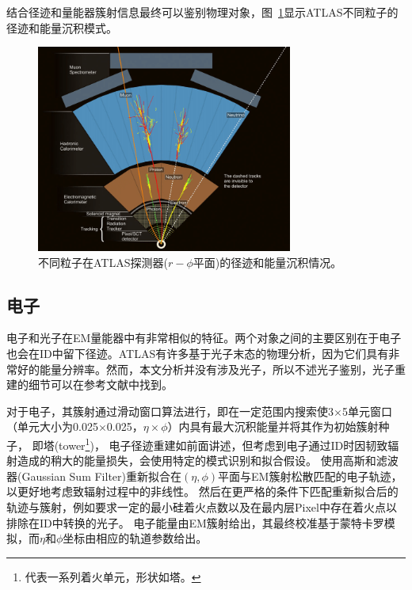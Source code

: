 结合径迹和量能器簇射信息最终可以鉴别物理对象，图~\ref{fig:particle_id_patterns}显示ATLAS不同粒子的径迹和能量沉积模式。
\begin{figure}
\centering
\includegraphics[width=0.75\textwidth]{fig/particle_ID_patterns.png}
\caption{不同粒子在ATLAS探测器($r-\phi$平面)的径迹和能量沉积情况。}
\label{fig:particle_id_patterns}
\end{figure}

\subsection{电子}
电子和光子在EM量能器中有非常相似的特征。两个对象之间的主要区别在于电子也会在ID中留下径迹。ATLAS有许多基于光子末态的物理分析，因为它们具有非常好的能量分辨率。然而，本文分析并没有涉及光子，所以不述光子鉴别，光子重建的细节可以在参考文献\cite{ATLAS-CONF-2012-123}中找到。

对于电子，其簇射通过滑动窗口算法进行\cite{Lampl:1099735}，即在一定范围内搜索使3$\times$5单元窗口（单元大小为0.025$\times$0.025，$\eta\times\phi$）内具有最大沉积能量并将其作为初始簇射种子，
即塔(tower\footnote{
代表一系列着火单元，形状如塔。
})，
电子径迹重建如前面讲述，但考虑到电子通过ID时因韧致辐射造成的稍大的能量损失，会使用特定的模式识别和拟合假设。
使用高斯和滤波器(Gaussian Sum Filter)\cite{ATLAS-CONF-2012-047}重新拟合在$(\eta,\phi)$平面与EM簇射松散匹配的电子轨迹，以更好地考虑致辐射过程中的非线性。 然后在更严格的条件下匹配重新拟合后的轨迹与簇射，例如要求一定的最小硅着火点数以及在最内层Pixel中存在着火点以排除在ID中转换的光子。 电子能量由EM簇射给出，其最终校准基于蒙特卡罗模拟\cite{Aad2014-cali}，而$\eta$和$\phi$坐标由相应的轨道参数给出。

